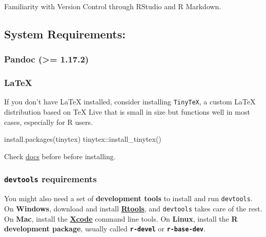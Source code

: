 \documentclass[
  letterpaper,
  DIV=11,
  numbers=noendperiod]{scrreprt}
\newenvironment{Shaded}{\begin{snugshade}}{\end{snugshade}}
\newcommand{\FunctionTok}[1]{\textcolor[rgb]{0.28,0.35,0.67}{#1}}
\newcommand{\NormalTok}[1]{\textcolor[rgb]{0.00,0.23,0.31}{#1}}
\newcommand{\SpecialCharTok}[1]{\textcolor[rgb]{0.37,0.37,0.37}{#1}}
\newcommand{\StringTok}[1]{\textcolor[rgb]{0.13,0.47,0.30}{#1}}
\begin{document}
Familiarity with Version Control through RStudio and R Markdown.

\hypertarget{system-requirements}{%
\subsection{System Requirements:}\label{system-requirements}}

\hypertarget{pandoc-1.17.2}{%
\subsubsection{Pandoc (\textgreater= 1.17.2)}\label{pandoc-1.17.2}}

\hypertarget{latex}{%
\subsubsection{LaTeX}\label{latex}}

If you don't have LaTeX installed, consider installing \texttt{TinyTeX},
a custom LaTeX distribution based on TeX Live that is small in size but
functions well in most cases, especially for R users.

\begin{Shaded}
\begin{Highlighting}[]
\FunctionTok{install.packages}\NormalTok{(}\StringTok{\textquotesingle{}tinytex\textquotesingle{}}\NormalTok{)}
\NormalTok{tinytex}\SpecialCharTok{::}\FunctionTok{install\_tinytex}\NormalTok{()}
\end{Highlighting}
\end{Shaded}

Check \href{https://yihui.name/tinytex/}{docs} before before installing.

\hypertarget{devtools-requirements}{%
\subsubsection{\texorpdfstring{\texttt{devtools}
requirements}{devtools requirements}}\label{devtools-requirements}}

You might also need a set of \textbf{development tools} to install and
run \texttt{devtools}. On \textbf{Windows}, download and install
\href{https://cran.r-project.org/bin/windows/Rtools/}{\textbf{Rtools}},
and \texttt{devtools} takes care of the rest. On \textbf{Mac}, install
the \href{https://developer.apple.com/xcode/}{\textbf{Xcode}} command
line tools. On \textbf{Linux}, install the \textbf{R development
package}, usually called \textbf{\texttt{r-devel}} or
\textbf{\texttt{r-base-dev}}.
\end{document}

